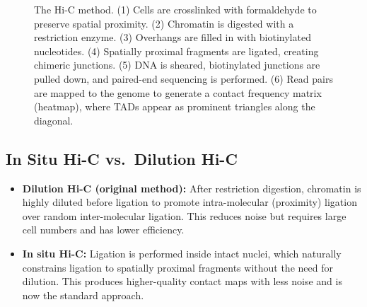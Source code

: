 \begin{figure}[htbp]
\caption[Hi-C proximity ligation principle.]{The Hi-C method. (1) Cells are crosslinked with formaldehyde to preserve spatial proximity. (2) Chromatin is digested with a restriction enzyme. (3) Overhangs are filled in with biotinylated nucleotides. (4) Spatially proximal fragments are ligated, creating chimeric junctions. (5) DNA is sheared, biotinylated junctions are pulled down, and paired-end sequencing is performed. (6) Read pairs are mapped to the genome to generate a contact frequency matrix (heatmap), where TADs appear as prominent triangles along the diagonal.}
\label{fig:3dgenome:hic-principle}
\end{figure}

\subsection{In Situ Hi-C vs.\ Dilution Hi-C}
\label{subsec:3dgenome:insitu-dilution}

\begin{itemize}[itemsep=3pt]
  \item \textbf{Dilution Hi-C (original method):} After restriction digestion, chromatin is highly diluted before ligation to promote intra-molecular (proximity) ligation over random inter-molecular ligation. This reduces noise but requires large cell numbers and has lower efficiency.
  \item \textbf{In situ Hi-C:} Ligation is performed inside intact nuclei, which naturally constrains ligation to spatially proximal fragments without the need for dilution. This produces higher-quality contact maps with less noise and is now the standard approach.
\end{itemize}

